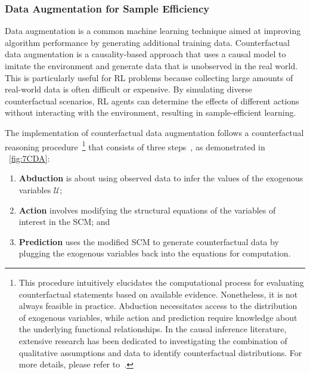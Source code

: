\documentclass[10pt]{article} %
\theoremstyle{definition}
\begin{document}
\subsubsection{Data Augmentation for Sample Efficiency}
Data augmentation is a common machine learning technique aimed at improving algorithm performance by generating additional training data. Counterfactual data augmentation is a causality-based approach that uses a causal model to imitate the environment and generate data that is unobserved in the real world. This is particularly useful for RL problems because collecting large amounts of real-world data is often difficult or expensive. By simulating diverse counterfactual scenarios, RL agents can determine the effects of different actions without interacting with the environment, resulting in sample-efficient learning.

The implementation of counterfactual data augmentation follows a counterfactual reasoning procedure~\footnote{This procedure intuitively elucidates the computational process for evaluating counterfactual statements based on available evidence. Nonetheless, it is not always feasible in practice. Abduction necessitates access to the distribution of exogenous variables, while action and prediction require knowledge about the underlying functional relationships. In the causal inference literature, extensive research has been dedicated to investigating the combination of qualitative assumptions and data to identify counterfactual distributions. For more details, please refer to~\citet{shpitserWhatCounterfactualsCan2007,correaNestedCounterfactualIdentification2021,zhangPartialCounterfactualIdentification2022}.} that consists of three steps~\citep[Chapter~7]{pearlCausalInferenceStatistics2009}, as demonstrated in \figurename~\ref{fig:7CDA}: 
\begin{enumerate}
    \item \textbf{Abduction} is about using observed data to infer the values of the exogenous variables $\mathcal{U}$;
    \item \textbf{Action} involves modifying the structural equations of the variables of interest in the SCM; and
    \item \textbf{Prediction} uses the modified SCM to generate counterfactual data by plugging the exogenous variables back into the equations for computation.
\end{enumerate}
\end{document}
